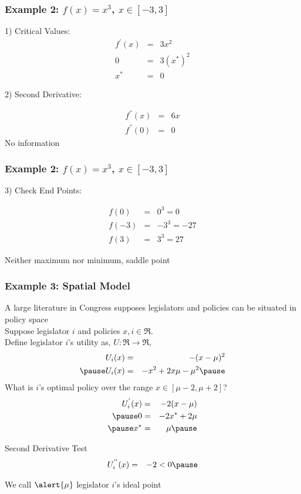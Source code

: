 \documentclass{beamer}
\numberwithin{equation}{section}
\begin{document}
\begin{frame}
\frametitle{Example 2: $f(x) = x^3$, $x \in [-3, 3] $ }

1) Critical Values: 
\begin{eqnarray}
f^{'}(x) & = & 3x^2 \nonumber \\
0 & = & 3 (x^{*})^{2} \nonumber \\
x^{*} & = & 0 \nonumber 
\end{eqnarray} \pause

2) Second Derivative: 

\begin{eqnarray}
f^{''}(x) & = & 6 x \nonumber \\
f^{''}(0) & = &  0 \nonumber 
\end{eqnarray}
\alert{No information}

\end{frame}



\begin{frame}
\frametitle{Example 2: $f(x) = x^3$, $x \in [-3, 3] $}


3) Check End Points: 

\begin{eqnarray}
f(0) & = & 0^3  = 0 \nonumber \\
f(-3) & = & -3^3 = -27 \nonumber \\
f(3) & = & 3^3 = 27 \nonumber 
\end{eqnarray}

Neither maximum nor minimum, \alert{saddle point} 

\end{frame}



\begin{frame}
\frametitle{Example 3: Spatial Model}
A large literature in Congress supposes legislators and policies can be situated in \alert{policy space} \pause \\

Suppose legislator $i$ and policies $x, i \in \Re$. \pause  \\
Define legislator $i$'s utility as, $U:\Re \rightarrow \Re$, \pause 
\begin{eqnarray}
U_{i} (x) & = & - (x - \mu)^{2}  \nonumber \\ \pause 
U_{i}(x) & = & - x^2 +  2 x \mu  - \mu^2 \nonumber \pause 
\end{eqnarray}
What is $i$'s optimal policy over the range $x \in [\mu- 2, \mu + 2]$? \pause 
\begin{eqnarray}
U_{i}^{'} (x) & = & -2 (x - \mu) \nonumber \\ \pause 
0 & = & -2x^{*} + 2 \mu \nonumber \\ \pause 
x^{*} & = & \mu \nonumber \pause 
\end{eqnarray}

\alert{Second Derivative Test} \pause 
\begin{eqnarray}
U^{''}_{i}(x)  & = & -2 <0  \nonumber \pause 
\end{eqnarray}

We call $\alert{\mu}$ legislator $i$'s \alert{ideal point} 

\end{frame} 
\end{document}
